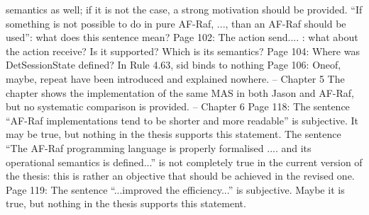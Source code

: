 \documentclass{article}
\begin{document}
semantics as well; if it is not the case, a strong motivation should be provided.
“If something is not possible to do in pure AF-Raf, ..., than an AF-Raf should be used”: what does this
sentence mean?
Page 102:
The action send.... : what about the action receive? Is it supported? Which is its semantics?
Page 104:
Where was DetSessionState defined?
In Rule 4.63, sid binds to nothing
Page 106:
Oneof, maybe, repeat have been introduced and explained nowhere.
-- Chapter 5
The chapter shows the implementation of the same MAS in both Jason and AF-Raf, but no systematic
comparison is provided.
-- Chapter 6
Page 118:
The sentence “AF-Raf implementations tend to be shorter and more readable” is subjective. It may
be true, but nothing in the thesis supports this statement.
The sentence “The AF-Raf programming language is properly formalised .... and its operational
semantics is defined...” is not completely true in the current version of the thesis: this is rather an
objective that should be achieved in the revised one.
Page 119:
The sentence “...improved the efficiency...” is subjective. Maybe it is true, but nothing in the thesis
supports this statement.
\end{document}
